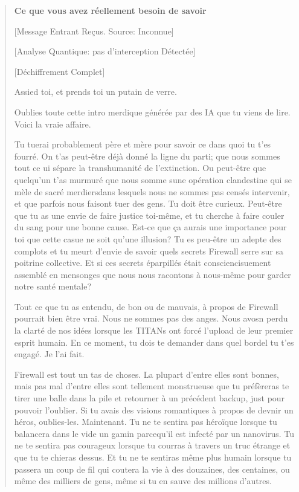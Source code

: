 \begin{quotation} 

\textbf{Ce que vous avez réellement besoin de savoir} 

[Message Entrant Reçus. Source: Inconnue] 

[Analyse Quantique: pas d'interception Détectée] 

[Déchiffrement Complet] 

Assied toi, et prends toi un putain de verre. 

Oublies toute cette intro merdique générée par des IA que tu viens de lire. Voici la vraie affaire. 

Tu tuerai probablement père et mère pour savoir ce dans quoi tu t'es fourré. On t'as peut-être déjà donné la ligne du parti; que nous sommes tout ce ui sépare la transhumanité de l'extinction. Ou peut-être que quelqu'un t'as murmuré que nous somme sune opération clandestine qui se mèle de sacré merdiersdans lesquels nous ne sommes pas censés intervenir, et que parfois nous faisont tuer des gens. Tu doit être curieux. Peut-être que tu as une envie de faire justice toi-même, et tu cherche à faire couler du sang pour une bonne cause. Est-ce que ça aurais une importance pour toi que cette casue ne soit qu'une illusion? Tu es peu-être un adepte des complots et tu meurt d'envie de savoir quels secrets Firewall serre sur sa poitrine collective. Et si ces secrets éparpillés était consciencisuement assemblé en mensonges que nous nous racontons à nous-même pour garder notre santé mentale? 

Tout ce que tu as entendu, de bon ou de mauvais, à propos de Firewall pourrait bien être vrai. Nous ne sommes pas des anges. Nous avosn perdu la clarté de nos idées lorsque les TITANs ont forcé l'upload de leur premier esprit humain. En ce moment, tu dois te demander dans quel bordel tu t'es engagé. Je l'ai fait. 

Firewall est tout un tas de choses. La plupart d'entre elles sont bonnes, mais pas mal d'entre elles sont tellement monstrueuse que tu préfèreras te tirer une balle dans la pile et retourner à un précédent backup, just pour pouvoir l'oublier. Si tu avais des visions romantiques à propos de devnir un héros, oublies-les. Maintenant. Tu ne te sentira pas héroïque lorsque tu balancera dans le vide un gamin parcequ'il est infecté par un nanovirus. Tu ne te sentira pas courageux lorsque tu courras à travers un truc étrange et que tu te chieras dessus. Et tu ne te sentiras même plus humain lorsque tu passera un coup de fil qui coutera la vie à des douzaines, des centaines, ou même des milliers de gens, même si tu en sauve des millions d'autres. 


\end{quotation}
